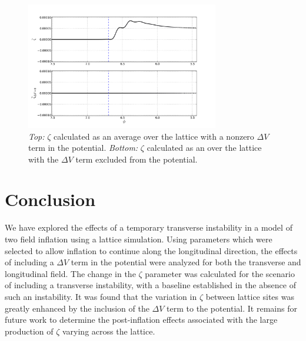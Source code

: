 \documentclass[letterpaper,11pt]{article}
\begin{document}
\begin{figure}
\begin{center}
\includegraphics[width=0.75\textwidth]{zeta_mean_plot1.png}
\caption{\emph{Top:} $\zeta$ calculated as an average over the lattice with a nonzero $\Delta V$ term in the potential. \emph{Bottom:} $\zeta$ calculated as an over the lattice with the $\Delta V$ term excluded from the potential.}
\label{zeta mean plot}
\end{center}
\end{figure}

\newpage
\section{Conclusion} \label{conclusion}
We have explored the effects of a temporary transverse instability in a model of two field inflation using a lattice simulation. Using parameters which were selected to allow inflation to continue along the longitudinal direction, the effects of including a $\Delta V$ term in the potential were analyzed for both the transverse and longitudinal field. The change in the $\zeta$ parameter was calculated for the scenario of including a transverse instability, with a baseline established in the absence of such an instability. It was found that the variation in $\zeta$ between lattice sites was greatly enhanced by the inclusion of the $\Delta V$ term to the potential. It remains for future work to determine the post-inflation effects associated with the large production of $\zeta$ varying across the lattice.



\end{document}
